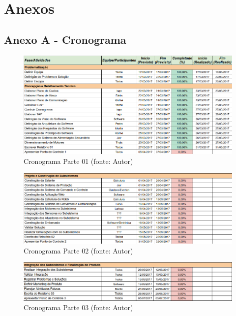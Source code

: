 \chapter[Anexos]{Anexos}
\section{Anexo A - Cronograma}

\begin{figure}[!h]
\centering
\includegraphics[scale=0.50, angle = 360]{figuras/cronograma1}
\caption[]{Cronograma Parte 01 (fonte: Autor)}
\end{figure}
\FloatBarrier

\begin{figure}[!h]
\centering
\includegraphics[scale=0.50, angle = 360]{figuras/cronograma2}
\caption[]{Cronograma Parte 02 (fonte: Autor)}
\end{figure}
\FloatBarrier

\begin{figure}[!h]
\centering
\includegraphics[scale=0.50, angle = 360]{figuras/cronograma3}
\caption[]{Cronograma Parte 03 (fonte: Autor)}
\end{figure}
\FloatBarrier

